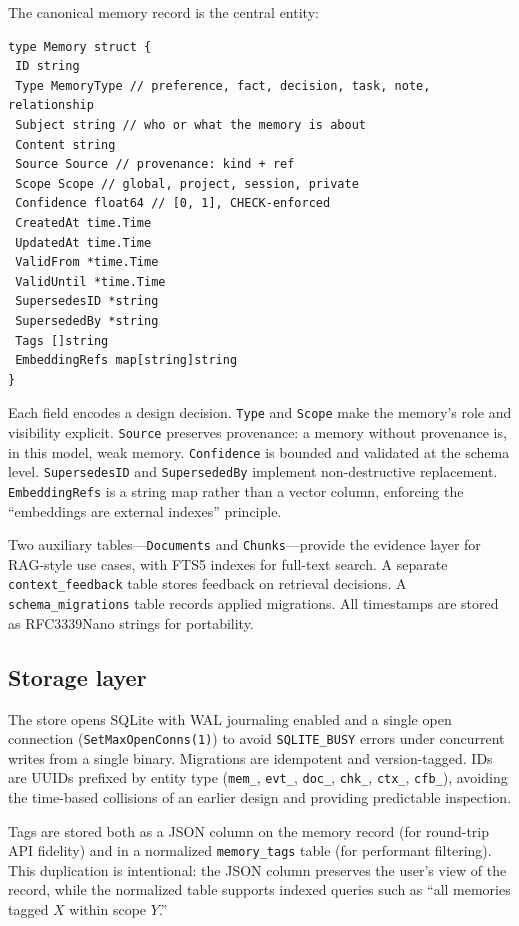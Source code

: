 \documentclass[11pt,a4paper]{article}
\begin{document}
The canonical memory record is the central entity:

\begin{lstlisting}[style=go]
type Memory struct {
 ID string
 Type MemoryType // preference, fact, decision, task, note, relationship
 Subject string // who or what the memory is about
 Content string
 Source Source // provenance: kind + ref
 Scope Scope // global, project, session, private
 Confidence float64 // [0, 1], CHECK-enforced
 CreatedAt time.Time
 UpdatedAt time.Time
 ValidFrom *time.Time
 ValidUntil *time.Time
 SupersedesID *string
 SupersededBy *string
 Tags []string
 EmbeddingRefs map[string]string
}
\end{lstlisting}

Each field encodes a design decision. \texttt{Type} and \texttt{Scope} make the memory's role and visibility explicit. \texttt{Source} preserves provenance: a memory without provenance is, in this model, weak memory. \texttt{Confidence} is bounded and validated at the schema level. \texttt{SupersedesID} and \texttt{SupersededBy} implement non-destructive replacement. \texttt{EmbeddingRefs} is a string map rather than a vector column, enforcing the ``embeddings are external indexes'' principle.

Two auxiliary tables---\texttt{Documents} and \texttt{Chunks}---provide the evidence layer for RAG-style use cases, with FTS5 indexes for full-text search. A separate \texttt{context\_feedback} table stores feedback on retrieval decisions. A \texttt{schema\_migrations} table records applied migrations. All timestamps are stored as RFC3339Nano strings for portability.

\subsection{Storage layer}

The store opens SQLite with WAL journaling enabled and a single open connection (\texttt{SetMaxOpenConns(1)}) to avoid \texttt{SQLITE\_BUSY} errors under concurrent writes from a single binary. Migrations are idempotent and version-tagged. IDs are UUIDs prefixed by entity type (\texttt{mem\_}, \texttt{evt\_}, \texttt{doc\_}, \texttt{chk\_}, \texttt{ctx\_}, \texttt{cfb\_}), avoiding the time-based collisions of an earlier design and providing predictable inspection.

Tags are stored both as a JSON column on the memory record (for round-trip API fidelity) and in a normalized \texttt{memory\_tags} table (for performant filtering). This duplication is intentional: the JSON column preserves the user's view of the record, while the normalized table supports indexed queries such as ``all memories tagged $X$ within scope $Y$.''
\end{document}
